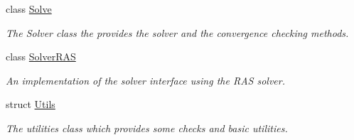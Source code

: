 \begin{DoxyCompactItemize}
class \hyperlink{classschwz_1_1Solve}{Solve}
\begin{DoxyCompactList}\small\item\em The Solver class the provides the solver and the convergence checking methods. \end{DoxyCompactList}\item 
class \hyperlink{classschwz_1_1SolverRAS}{Solver\+R\+AS}
\begin{DoxyCompactList}\small\item\em An implementation of the solver interface using the R\+AS solver. \end{DoxyCompactList}\item 
struct \hyperlink{structschwz_1_1Utils}{Utils}
\begin{DoxyCompactList}\small\item\em The utilities class which provides some checks and basic utilities. \end{DoxyCompactList}\end{DoxyCompactItemize}
